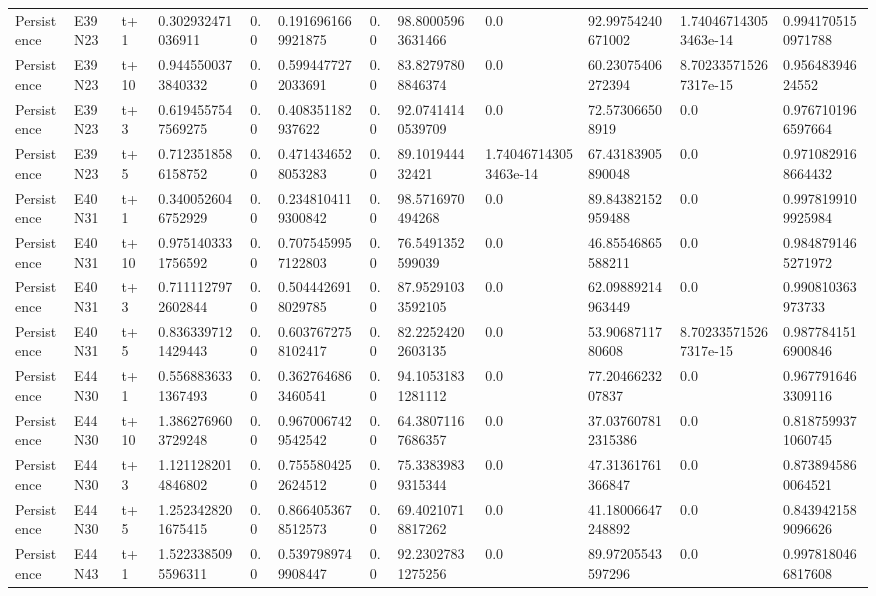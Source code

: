 \begin{landscape}
\begin{longtable}{llllllllllll}
Persistence & E39N23 & t+1 & 0.302932471036911 & 0.0 & 0.1916961669921875 & 0.0 & 98.80005963631466 & 0.0 & 92.99754240671002 & 1.740467143053463e-14 & 0.9941705150971788 \\
Persistence & E39N23 & t+10 & 0.9445500373840332 & 0.0 & 0.5994477272033691 & 0.0 & 83.82797808846374 & 0.0 & 60.23075406272394 & 8.702335715267317e-15 & 0.95648394624552 \\
Persistence & E39N23 & t+3 & 0.6194557547569275 & 0.0 & 0.408351182937622 & 0.0 & 92.07414140539709 & 0.0 & 72.573066508919 & 0.0 & 0.9767101966597664 \\
Persistence & E39N23 & t+5 & 0.7123518586158752 & 0.0 & 0.4714346528053283 & 0.0 & 89.101944432421 & 1.740467143053463e-14 & 67.43183905890048 & 0.0 & 0.9710829168664432 \\
Persistence & E40N31 & t+1 & 0.3400526046752929 & 0.0 & 0.2348104119300842 & 0.0 & 98.5716970494268 & 0.0 & 89.84382152959488 & 0.0 & 0.9978199109925984 \\
Persistence & E40N31 & t+10 & 0.9751403331756592 & 0.0 & 0.7075459957122803 & 0.0 & 76.5491352599039 & 0.0 & 46.85546865588211 & 0.0 & 0.9848791465271972 \\
Persistence & E40N31 & t+3 & 0.7111127972602844 & 0.0 & 0.5044426918029785 & 0.0 & 87.95291033592105 & 0.0 & 62.09889214963449 & 0.0 & 0.990810363973733 \\
Persistence & E40N31 & t+5 & 0.8363397121429443 & 0.0 & 0.6037672758102417 & 0.0 & 82.22524202603135 & 0.0 & 53.9068711780608 & 8.702335715267317e-15 & 0.9877841516900846 \\
Persistence & E44N30 & t+1 & 0.5568836331367493 & 0.0 & 0.3627646863460541 & 0.0 & 94.10531831281112 & 0.0 & 77.2046623207837 & 0.0 & 0.9677916463309116 \\
Persistence & E44N30 & t+10 & 1.3862769603729248 & 0.0 & 0.9670067429542542 & 0.0 & 64.38071167686357 & 0.0 & 37.037607812315386 & 0.0 & 0.8187599371060745 \\
Persistence & E44N30 & t+3 & 1.1211282014846802 & 0.0 & 0.7555804252624512 & 0.0 & 75.33839839315344 & 0.0 & 47.31361761366847 & 0.0 & 0.8738945860064521 \\
Persistence & E44N30 & t+5 & 1.2523428201675415 & 0.0 & 0.8664053678512573 & 0.0 & 69.40210718817262 & 0.0 & 41.18006647248892 & 0.0 & 0.8439421589096626 \\
Persistence & E44N43 & t+1 & 1.5223385095596311 & 0.0 & 0.5397989749908447 & 0.0 & 92.23027831275256 & 0.0 & 89.97205543597296 & 0.0 & 0.9978180466817608 \\

\end{longtable}
\end{landscape}
